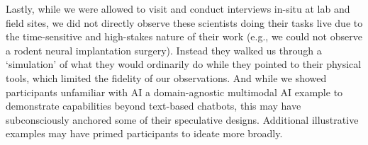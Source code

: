 Lastly, while we were allowed to visit and conduct interviews in-situ at lab and field sites, we did not directly observe these scientists doing their tasks live due to the time-sensitive and high-stakes nature of their work (e.g., we could not observe a rodent neural implantation surgery). Instead they walked us through a `simulation' of what they would ordinarily do while they pointed to their physical tools, which limited the fidelity of our observations. And while we showed participants unfamiliar with AI a domain-agnostic multimodal AI example to demonstrate capabilities beyond text-based chatbots, this may have subconsciously anchored some of their speculative designs. Additional illustrative examples may have primed participants to ideate more broadly.

